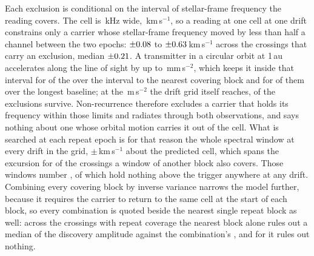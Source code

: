 Each exclusion is conditional on the interval of stellar-frame frequency the
reading covers. The cell is \TjChanKHz\,kHz wide, \TjChanKms\,km\,s$^{-1}$,
so a reading at one cell at one drift constrains only a carrier whose
stellar-frame frequency moved by less than half a channel between the two
epochs: $\pm0.08$ to $\pm0.63$\,km\,s$^{-1}$ across the \RqNUnit{}
crossings that carry an exclusion, median $\pm0.21$. A transmitter in a
circular orbit at 1\,au accelerates along the line of sight by up to
\RqOrbAu\,mm\,s$^{-2}$, which keeps it inside that interval for
\RqNOrbNear{} of the \RqNUnit{} over the interval to the nearest covering
block and for \RqNOrbFar{} of them over the longest baseline; at the
\WdAGrid\,m\,s$^{-2}$ the drift grid itself reaches, \RqOrbGridWord{} of the
exclusions survive. Non-recurrence therefore excludes a carrier that holds
its frequency within those limits and radiates through both observations, and
says nothing about one whose orbital motion carries it out of the cell. What
is searched at each repeat epoch is for that reason the whole spectral window
at every drift in the grid, $\pm$\WdHalfKms\,km\,s$^{-1}$ about the predicted
cell, which spans the excursion for \WdNOrbSpan{} of the \WdNOrbTot{}
crossings a window of another block also covers. Those windows
number \WdNCov, of which \WdNEmpty{} hold nothing above the trigger anywhere
at any drift. Combining every covering block by inverse variance narrows the
model further, because it requires the carrier to return to the same cell at
the start of each block, so every combination is quoted beside the nearest
single repeat block as well: across the \TjCombNCross{} crossings with repeat
coverage the nearest block alone rules out a median \TjFracNearMed{} of the
discovery amplitude against the combination's \TjFracCombMed, and for
\TjNNearWeak{} it rules out nothing.

